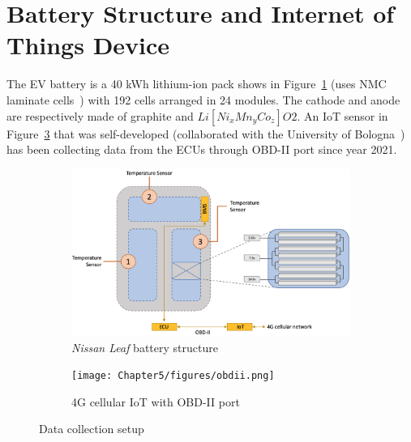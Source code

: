 \newpage

\section{Battery Structure and Internet of Things Device}
\label{sec:thermal_dynamics_case_study_intro}

The \gls{EV} battery is a 40 kWh lithium-ion pack shows in Figure~\ref{fig:leaf_bat_pack} (uses \gls{NMC} laminate cells~\cite{calearo2019modeling}) with 192 cells arranged in 24 modules. 
The cathode and anode are respectively made of graphite and $Li[Ni_xMn_yCo_z]O2$. 
An \gls{IoT} sensor in Figure~\ref{fig:colletion_setup} that was self-developed (collaborated with the University of Bologna~\cite{CCNC_2022}) has been collecting data from the \glspl{ECU} through \gls{OBD-II} port since year 2021. 


\begin{figure} [htbp]
	\centering
	\begin{subfigure}{0.45\linewidth}
		\includegraphics[width=\linewidth]{Chapter5/figures/leaf_pack_temp_sensor.png}
		\caption{\textit{Nissan Leaf} battery structure~\cite{kane_2020_see}}
        \label{fig:leaf_bat_pack}
	\end{subfigure}
	\quad
    \begin{subfigure}{0.42\linewidth}
		\texttt{[image: Chapter5/figures/obdii.png]}
		\caption{4G cellular \gls{IoT} with \gls{OBD-II} port}
        \label{fig:colletion_setup}
	\end{subfigure}
    \caption{Data collection setup}
\end{figure}


